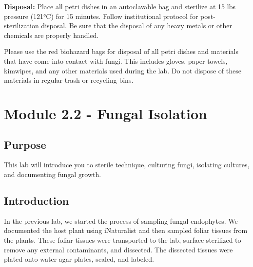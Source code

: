 \documentclass[
  letterpaper,
  DIV=11,
  numbers=noendperiod]{scrreprt}
\begin{document}
\textbf{Disposal:} Place all petri dishes in an autoclavable bag and
sterilize at 15 lbs pressure (121°C) for 15 minutes. Follow
institutional protocol for post-sterilization disposal. Be sure that the
disposal of any heavy metals or other chemicals are properly handled.

\begin{tcolorbox}[enhanced jigsaw, arc=.35mm, bottomrule=.15mm, bottomtitle=1mm, breakable, colback=white, colbacktitle=quarto-callout-important-color!10!white, colframe=quarto-callout-important-color-frame, coltitle=black, left=2mm, leftrule=.75mm, opacityback=0, opacitybacktitle=0.6, rightrule=.15mm, title=\textcolor{quarto-callout-important-color}{\faExclamation}\hspace{0.5em}{Important}, titlerule=0mm, toprule=.15mm, toptitle=1mm]

Please use the red biohazard bags for disposal of all petri dishes and
materials that have come into contact with fungi. This includes gloves,
paper towels, kimwipes, and any other materials used during the lab. Do
not dispose of these materials in regular trash or recycling bins.

\end{tcolorbox}

\section*{Module 2.2 - Fungal
Isolation}\label{module-2.2---fungal-isolation}


\subsection*{Purpose}\label{purpose-1}

This lab will introduce you to sterile technique, culturing fungi,
isolating cultures, and documenting fungal growth.

\subsection*{Introduction}\label{introduction-2}

In the previous lab, we started the process of sampling fungal
endophytes. We documented the host plant using iNaturalist and then
sampled foliar tissues from the plants. These foliar tissues were
transported to the lab, surface sterilized to remove any external
contaminants, and dissected. The dissected tissues were plated onto
water agar plates, sealed, and labeled.
\end{document}
